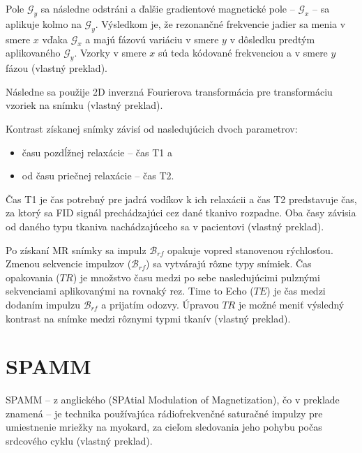 Pole $\mathcal{G}_{y}$ sa následne odstráni a ďalšie gradientové magnetické pole -- $\mathcal{G}_{x}$ -- sa aplikuje kolmo na $\mathcal{G}_{y}$. Výsledkom je, že rezonančné frekvencie jadier sa menia v smere $x$ vďaka $\mathcal{G}_{x}$ a majú fázovú variáciu v smere $y$ v dôsledku predtým aplikovaného $\mathcal{G}_{y}$. Vzorky v smere $x$ sú teda kódované frekvenciou a v smere $y$ fázou \cite{basic_principles_of_mri} (vlastný preklad).

Následne sa použije 2D inverzná Fourierova transformácia pre transformáciu vzoriek na snímku \cite{basic_principles_of_mri} (vlastný preklad).

Kontrast získanej snímky závisí od nasledujúcich dvoch parametrov:

\begin {itemize}
\item {času pozdĺžnej relaxácie -- čas T1 a}
\item {od času priečnej relaxácie -- čas T2.}
\end {itemize}

Čas T1 je čas potrebný pre jadrá vodíkov k ich relaxácii a čas T2 predstavuje čas, za ktorý sa FID signál prechádzajúci cez dané tkanivo rozpadne. Oba časy závisia od daného typu tkaniva nachádzajúceho sa v pacientovi \cite{basic_principles_of_mri} (vlastný preklad).

Po získaní MR snímky sa impulz $\mathcal{B}_{rf}$ opakuje vopred stanovenou rýchlosťou. Zmenou sekvencie impulzov ($\mathcal{B}_{rf}$) sa vytvárajú rôzne typy snímiek. Čas opakovania ($TR$) je množstvo času medzi po sebe nasledujúcimi pulznými sekvenciami aplikovanými na rovnaký rez. Time to Echo ($TE$) je čas medzi dodaním impulzu $\mathcal{B}_{rf}$ a prijatím odozvy. Úpravou $TR$ je možné meniť výsledný kontrast na snímke medzi rôznymi typmi tkanív \cite{basic_principles_of_mri} (vlastný preklad).

\section {SPAMM}
SPAMM -- z anglického (SPAtial Modulation of Magnetization), čo v preklade znamená  -- je technika používajúca rádiofrekvenčné saturačné impulzy pre umiestnenie mriežky na myokard, za cieľom sledovania jeho pohybu počas srdcového cyklu \cite{spamm_description} (vlastný preklad).

